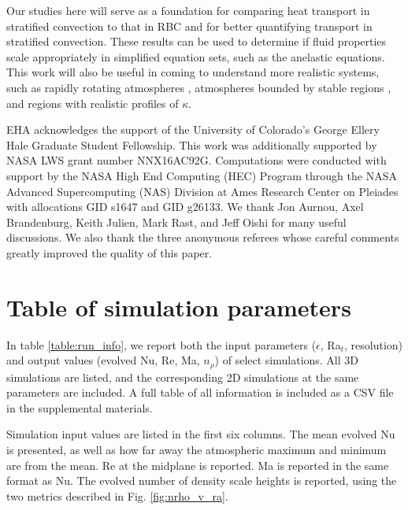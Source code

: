 \documentclass[aps, prfluids, onecolumn, notitlepage, nofootinbib, groupedaddress, amsfonts, amssymb, amsmath]{revtex4-1}
\begin{document}
Our studies here will serve as a foundation for 
comparing heat transport in stratified convection
to that in RBC \cite{johnston&doering2009}
and for better quantifying transport in stratified convection.  
These results can be used to determine if fluid properties
scale appropriately in simplified equation sets, 
such as the anelastic equations.
This work will also be useful in coming to understand more realistic systems, 
such as rapidly rotating atmospheres \cite{julien&all2012},
atmospheres bounded by stable regions \cite{hurlburt&all1986}, 
and regions with realistic profiles of $\kappa$.



\begin{acknowledgments}
EHA acknowledges the support of the University of Colorado's George 
Ellery Hale Graduate Student Fellowship.
This work was additionally supported by  NASA LWS grant number NNX16AC92G.  
Computations were conducted 
with support by the NASA High End Computing (HEC) Program through the NASA 
Advanced Supercomputing (NAS) Division at Ames Research Center on Pleiades
with allocations GID s1647 and GID g26133.
We thank Jon Aurnou, Axel Brandenburg, Keith Julien, Mark Rast, and Jeff Oishi 
for many useful discussions. We also thank the three anonymous referees whose
careful comments greatly improved the quality of this paper.
\end{acknowledgments}



\appendix
\section{Table of simulation parameters}
In table \ref{table:run_info}, we report both the input parameters ($\epsilon$, Ra$_t$, resolution)
and output values (evolved Nu, Re, Ma, $n_\rho$) of select simulations.  All 3D simulations
are listed, and the corresponding 2D simulations at the same parameters are included.  A full
table of all information is included as a CSV file in the supplemental materials.

Simulation input values are listed in the first six columns.  The mean evolved Nu
is presented, as well as how far away the atmospheric maximum and minimum are from
the mean.  Re at the midplane is reported.  Ma is reported
in the same format as Nu.  The evolved number of density scale heights is reported, using the two
metrics described in Fig. \ref{fig:nrho_v_ra}.
\end{document}
